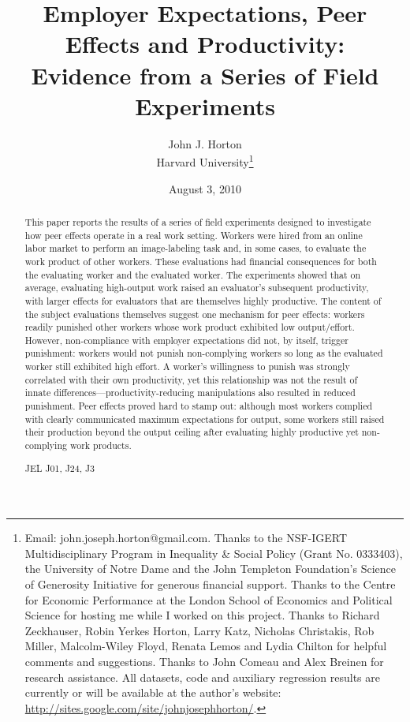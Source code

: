 \documentclass[12pt]{article}
\begin{document}
 
\title{Employer Expectations, Peer Effects and Productivity:
  \\ Evidence from a Series of Field Experiments} \date{August 3, 2010}

\author{John J. Horton \\ Harvard University\footnote{ Email:
    john.joseph.horton@gmail.com.  Thanks to the NSF-IGERT
    Multidisciplinary Program in Inequality \& Social Policy (Grant
    No. 0333403), the University of Notre Dame and the John Templeton
    Foundation's Science of Generosity Initiative for generous
    financial support. Thanks to the Centre for Economic Performance
    at the London School of Economics and Political Science for
    hosting me while I worked on this project. Thanks to Richard
    Zeckhauser, Robin Yerkes Horton, Larry Katz, Nicholas Christakis,
    Rob Miller, Malcolm-Wiley Floyd, Renata Lemos and Lydia Chilton
    for helpful comments and suggestions. Thanks to John Comeau and
    Alex Breinen for research assistance. All datasets, code and
    auxiliary regression results are currently or will be available at
    the author's website:
    \href{http://sites.google.com/site/johnjosephhorton/}{http://sites.google.com/site/johnjosephhorton/}.}}

\maketitle

\begin{abstract} 
This paper reports the results of a series of field experiments
designed to investigate how peer effects operate in a real work
setting. Workers were hired from an online labor market to perform an
image-labeling task and, in some cases, to evaluate the work product
of other workers. These evaluations had financial consequences for
both the evaluating worker and the evaluated worker. The experiments
showed that on average, evaluating high-output work raised an
evaluator's subsequent productivity, with larger effects for
evaluators that are themselves highly productive. The content of the
subject evaluations themselves suggest one mechanism for peer effects:
workers readily punished other workers whose work product exhibited
low output/effort. However, non-compliance with employer expectations
did not, by itself, trigger punishment: workers would not punish
non-complying workers so long as the evaluated worker still exhibited
high effort. A worker's willingness to punish was strongly correlated
with their own productivity, yet this relationship was not the result
of innate differences---productivity-reducing manipulations also
resulted in reduced punishment. Peer effects proved hard to stamp out:
although most workers complied with clearly communicated maximum
expectations for output, some workers still raised their production
beyond the output ceiling after evaluating highly productive yet
non-complying work products.
\newline

JEL J01, J24, J3
\end{abstract}
\end{document}
